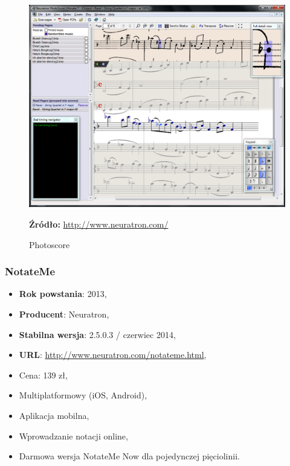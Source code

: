 \documentclass[polish,thesis,12pt]{dcsbook}
\newcommand{\source}[2]{
  	\caption*{\textbf{Źródło:} \href{#1}{{#2}}}
}
\begin{document}
\begin{figure}[H]
  \centering
  \includegraphics[scale=0.35,bb=0 0 1064 842]{img/photoscore.png}
  \caption{Photoscore}
  \label{photoscore}
  \source{http://www.neuratron.com/photoscore.htm}{http://www.neuratron.com/}
\end{figure}

\subsubsection{NotateMe}
\begin{itemize}
  \item \textbf{Rok powstania}: 2013,
  \item \textbf{Producent}: Neuratron,
  \item \textbf{Stabilna wersja}: 2.5.0.3 / czerwiec 2014,
  \item \textbf{URL}: \url{http://www.neuratron.com/notateme.html},
  \item Cena: 139 zł,
  \item Multiplatformowy (iOS, Android),
  \item Aplikacja mobilna,
  \item Wprowadzanie notacji online,
  \item Darmowa wersja NotateMe Now dla pojedynczej pięciolinii.
\end{itemize}
\end{document}
